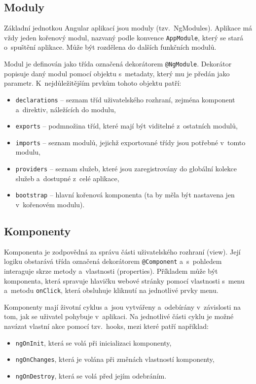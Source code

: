 \documentclass[
  digital, %
  oneside, %
  table,   %
  nolof,     %
  nolot,     %
]{fithesis3}
\begin{document}
\subsection{Moduly}
Základní jednotkou Angular aplikací jsou moduly (tzv.~NgModules). Aplikace má vždy jeden kořenový modul, nazvaný podle konvence \verb|AppModule|, který se stará o~spuštění aplikace. Může být rozdělena do dalších funkčních modulů.\par
Modul je definován jako třída označená dekorátorem \verb|@NgModule|. Dekorátor popisuje daný modul pomocí objektu s~metadaty, který mu je předán jako parametr. K~nejdůležitějším prvkům tohoto objektu patří: \cite{angulario}
\begin{itemize}
  \item \verb|declarations| – seznam tříd uživatelského rozhraní, zejména komponent a~direktiv, náležících do modulu,
  \item \verb|exports| – podmnožina tříd, které mají být viditelné z~ostatních modulů,
  \item \verb|imports| – seznam modulů, jejichž exportované třídy jsou potřebné v~tomto modulu,
  \item \verb|providers| – seznam služeb, které jsou zaregistrovány do globální kolekce služeb a~dostupné z~celé aplikace,
  \item \verb|bootstrap| – hlavní kořenová komponenta (ta by měla být nastavena jen v~kořenovém modulu).
\end{itemize}

\subsection{Komponenty}
Komponenta je zodpovědná za správu části uživatelského rozhraní (view). Její logiku obstarává třída označená dekorátorem \verb|@Component| a~s~pohledem interaguje skrze metody a~vlastnosti (properties). Příkladem může být komponenta, která spravuje hlavičku webové stránky pomocí vlastnosti s~menu a~metodu \verb|onClick|, která obsluhuje kliknutí na jednotlivé prvky menu.\par
Komponenty mají životní cyklus a~jsou vytvářeny a~odebírány v~závislosti na tom, jak se uživatel pohybuje v~aplikaci. Na jednotlivé části cyklu je možné navázat vlastní akce pomocí tzv.~hooks, mezi které patří například: \cite{angulario}
\begin{itemize}
  \item \verb|ngOnInit|, která se volá při inicializaci komponenty,
  \item \verb|ngOnChanges|, která je volána při změnách vlastností komponenty,
  \item \verb|ngOnDestroy|, která se volá před jejím odebráním.
\end{itemize}
\end{document}
